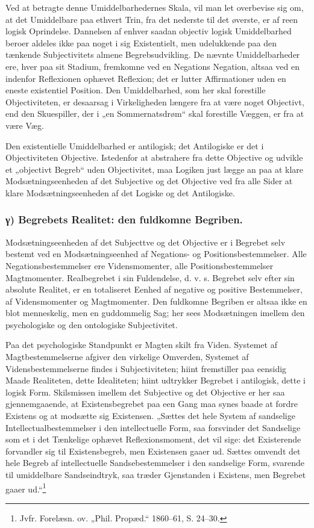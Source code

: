 \documentclass[11pt]{book}
\newcommand{\opage}[1]{\marginnote{\footnotesize\textit{[#1]}}}
\begin{document}
Ved at betragte denne Umiddelbarhedernes Skala, vil man let overbevise
sig om, at det Umiddelbare paa ethvert
\opage{166} \setcounter{footnote}{0}%
Trin, fra det nederste til det øverste, er af reen logisk Oprindelse.
Dannelsen af enhver saadan objectiv logisk Umiddelbarhed beroer
aldeles ikke paa noget i sig Existentielt, men udelukkende paa den
tænkende Subjectivitets almene Begrebsudvikling. De nævnte
Umiddelbarheder ere, hver paa sit Stadium, fremkomne ved en Negations
Negation, altsaa ved en indenfor Reflexionen ophævet Reflexion; det er
lutter Affirmationer uden en eneste existentiel Position. Den
Umiddelbarhed, som her skal forestille Objectiviteten, er desaarsag i
Virkeligheden længere fra at være noget Objectivt, end den
Skuespiller, der i „en Sommernatsdrøm“ skal forestille Væggen, er fra
at være Væg.

Den existentielle Umiddelbarhed er antilogisk; det Antilogiske er det
i Objectiviteten Objective. Istedenfor at abstrahere fra dette
Objective og udvikle et „objectivt Begreb“ uden Objectivitet, maa
Logiken just lægge an paa at klare Modsætningseenheden af det
Subjective og det Objective ved fra alle Sider at klare
Modsætningseenheden af det Logiske og det Antilogiske.

\subsubsection*{γ) Begrebets Realitet: den fuldkomne Begriben.}

Modsætningseenheden af det Subjecttve og det Objective %
er i Begrebet selv bestemt ved en Modsætningseenhed af Negations- og
Positionsbestemmelser. Alle Negationsbestemmelser ere
Vidensmomenter, alle Positionsbestemmelser Magtmomenter. Realbegrebet
i sin Fuldendelse, d. v. s. Begrebet selv efter sin absolute Realitet,
er en totaliseret Eenhed af negative og positive Bestemmelser, af
Vidensmomenter og Magtmomenter. Den fuldkomne Begriben er altsaa ikke
en blot menneskelig, men en guddommelig Sag; her sees Modsætningen
imellem den psychologiske og den ontologiske Subjectivitet.

Paa det psychologiske Standpunkt er Magten skilt fra Viden. Systemet
af Magtbestemmelserne afgiver den virkelige
\opage{167} \setcounter{footnote}{0}%
Omverden, Systemet af Vidensbestemmelserne findes i Subjectiviteten;
hiint fremstiller paa eensidig Maade Realiteten, dette Idealiteten;
hiint udtrykker Begrebet i antilogisk, dette i logisk Form.
Skilsmissen imellem det Subjective og det Objective er her saa
gjennemgaaende, at Existensbegrebet paa een Gang maa synes baade at
fordre Existens og at modsætte sig Existensen. „Sættes det hele System
af sandselige Intellectualbestemmelser i den intellectuelle Form, saa
forsvinder det Sandselige som et i det Tænkelige ophævet
Reflexionsmoment, det vil sige: det Existerende forvandler sig til
Existensbegreb, men Existensen gaaer ud. Sættes omvendt det hele
Begreb af intellectuelle Sandsebestemmelser i den sandselige Form,
svarende til umiddelbare Sandseindtryk, saa træder Gjenstanden i
Existens, men Begrebet gaaer ud.“\footnote{Jvfr. Forelæsn. ov. „Phil.
Propæd.“ 1860--61, S. 24--30.} %
\end{document}
